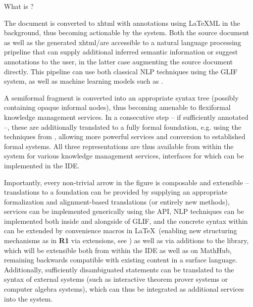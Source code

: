 \begin{sfragment}{What is \sTeX?}
{The document is converted to xhtml with \omdoc annotations
using \LaTeX ML in the background,
thus becoming actionable by the \mmt system. Both the source document
as well as the generated xhtml/\omdoc are accessible to a natural language
processing pripeline that can supply additional inferred semantic 
information or suggest annotations to the user, in the latter case 
augmenting the source document directly. This pipeline can use both 
classical NLP techniques using the GLIF system, as well as machine 
learning models such as \cite{own:fifom}.

A semiformal fragment is converted 
into an appropriate syntax tree (possibly containing opaque
informal nodes), 
thus becoming amenable
to flexiformal knowledge management services. In a consecutive step
-- if sufficiently annotated --, these are
additionally translated
to a fully formal foundation, e.g. using the techniques from 
\cite{DMueller:phd:19,own:translations}, allowing
more powerful services and conversion to established formal
systems. All three representations
are thus available from within the \mmt system for various
knowledge management services, interfaces for which can be
implemented in the IDE.

Importantly, every non-trivial arrow in the figure is 
composable and extensible -- 
translations to a foundation can be provided
by supplying an appropriate formalization and alignment-based
translations (or entirely new methods),
services can be implemented generically using the \mmt API,
NLP techniques can be implemented both inside and alongside of
GLIF, and the concrete syntax within \sTeX can be extended
by convenience macros in \LaTeX\ (enabling new
structuring mechanisms as in \textbf{R1} via 
\mmt extensions, see
\cite{MueRabRot:rslffml20}) as well as via additions to
the library, which will be extensible both from within the IDE
as well as on MathHub,
remaining backwards compatible with existing content in a surface 
language. Additionally, sufficiently disambiguated
statements can be translated to the syntax of 
external systems (such as interactive theorem prover systems
or computer algebra systems),
which can thus be integrated as additional services into the system.
}

\end{sfragment}

